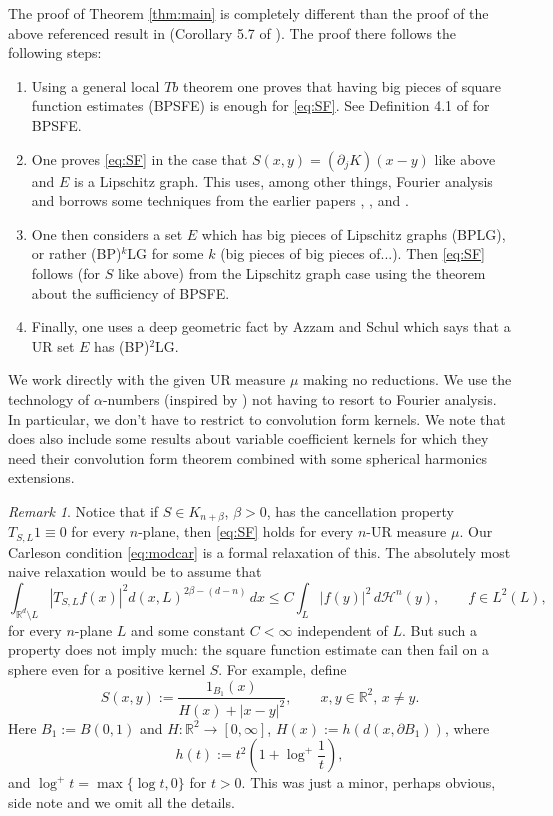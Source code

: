 \documentclass[11pt,a4paper,leqno]{amsart}
\newcommand{\R}{\mathbb{R}}
\numberwithin{equation}{section}
\theoremstyle{plain}
\theoremstyle{definition}
\theoremstyle{remark}
\newtheorem{rem}[equation]{Remark}
\begin{document}
The proof of Theorem \ref{thm:main} is completely different than the proof of the above referenced result in \cite{HMMM} (Corollary 5.7 of \cite{HMMM}).
The proof there follows the following steps:
\begin{enumerate}
\item Using a general local $Tb$ theorem one proves that having big pieces of square function estimates (BPSFE) is enough
for \eqref{eq:SF}. See Definition 4.1 of \cite{HMMM} for BPSFE.
\item One proves \eqref{eq:SF} in the case that $S(x,y) = (\partial_j K)(x-y)$ like above and $E$ is a Lipschitz graph. This uses, among other things, Fourier
analysis and borrows some techniques from the earlier papers \cite{Ch}, \cite{H1}, \cite{HL} and \cite{Jo1}.
\item One then considers a set $E$ which has big pieces of Lipschitz graphs (BPLG), or rather (BP)$^{k}$LG for some $k$ (big pieces of big pieces of...). Then \eqref{eq:SF}
follows (for $S$ like above) from the Lipschitz graph case using the theorem about the sufficiency of BPSFE.
\item Finally, one uses a deep geometric fact by Azzam and Schul \cite{AS} which says that a UR set $E$ has (BP)$^{2}$LG.
\end{enumerate}
We work directly with the given UR measure $\mu$ making no reductions. We use the technology of $\alpha$-numbers (inspired by \cite{CGLT}) not having to
resort to Fourier analysis. In particular, we don't have to restrict to convolution form kernels. We note that \cite{HMMM} does also include some
results about variable coefficient kernels for which they need their convolution form theorem combined with some
spherical harmonics extensions.

\begin{rem}
Notice that if $S \in K_{n+\beta}$, $\beta > 0$, has the cancellation property $T_{S,L}1 \equiv 0$ for every $n$-plane, then \eqref{eq:SF} holds
for every $n$-UR measure $\mu$. Our Carleson condition \eqref{eq:modcar} is a formal relaxation of this. The absolutely most naive relaxation would be to assume that
\begin{displaymath}
\int_{\R^{d} \setminus L} |T_{S, L}f(x)|^2 d(x, L)^{2\beta-(d-n)}\, dx \le C \int_L |f(y)|^2 \,d\mathcal{H}^n(y), \qquad f \in L^2(L),
\end{displaymath}
for every $n$-plane $L$ and some constant $C < \infty$ independent of $L$. But such a property does not imply much: the square function estimate
can then fail on a sphere even for a positive kernel $S$. For example, define
\begin{displaymath}
S(x,y) := \frac{1_{B_{1}}(x)}{H(x) + |x-y|^2}, \qquad x, y \in \R^2,\, x \ne y.
\end{displaymath}
Here $B_{1} := B(0,1)$ and $H\colon \R^2 \to [0,\infty]$, $H(x) := h(d(x,\partial B_{1}))$, where 
\begin{displaymath}
h(t) := t^2 \left(1 + \log^{+} \frac{1}{t} \right),
\end{displaymath}
and $\log^{+} t = \max\{\log t,0\}$ for $t > 0$. This was just a minor, perhaps obvious, side note and we omit all the details.
\end{rem}
\end{document}
